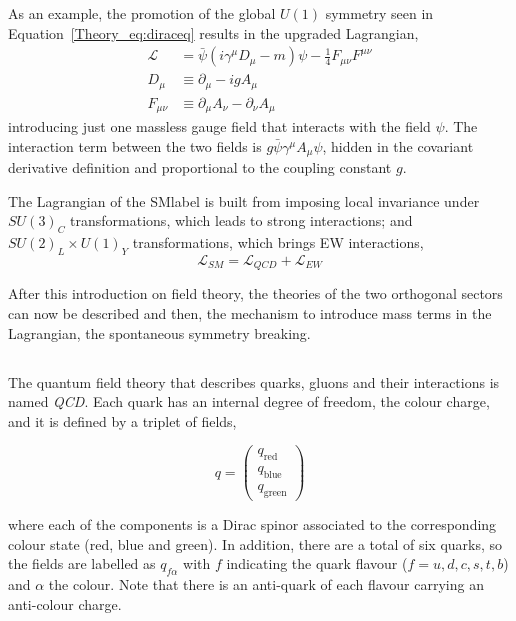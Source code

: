 As an example, the promotion of the global $U(1)$ symmetry seen in Equation~\ref{Theory_eq:diraceq} results in the upgraded Lagrangian,
\begin{equation}
\label{Theory_eq:diraceq20}
\begin{split}
    \mathcal{L}_{\ \ } &= \bar{\psi}(i\gamma^\mu D_\mu-m)\psi - \frac{1}{4}F_{\mu\nu}F^{\mu\nu} \\
    D_{\mu \ } &\equiv \partial_\mu -igA_\mu \\
    F_{\mu\nu} &\equiv \partial_\mu A_\nu - \partial_\nu A_\mu
\end{split}
\end{equation}
introducing just one massless gauge field that interacts with the field $\psi$.
The interaction term between the two fields is $g\bar{\psi}\gamma^\mu A_\mu\psi$,
hidden in the covariant derivative definition and proportional to the coupling constant $g$.

The Lagrangian of the \acrshort{SMlabel} is built from imposing local invariance under $SU(3)_C$ transformations,
which leads to strong interactions; and $SU(2)_L\times U(1)_Y$ transformations, which brings EW interactions,
\begin{equation}
    \mathcal{L}_{SM} = \mathcal{L}_{QCD}+\mathcal{L}_{EW}
\end{equation}

After this introduction on field theory, the theories of the two orthogonal sectors can now be described and then,
the mechanism to introduce mass terms in the Lagrangian, the spontaneous symmetry breaking.

\subsection{}
\label{subsec:QCD}
The quantum field theory that describes quarks, gluons and their interactions is named \textit{\acrlong{QCD}}. Each quark has an internal degree of freedom, the colour charge, and it is defined by a triplet of fields,

\begin{equation}
\label{Theory_eq:colortriplet}
    q=\begin{pmatrix}
    q_{\mathrm{red}}\\
    q_{\mathrm{blue}}\\
    q_{\mathrm{green}}
    \end{pmatrix}
\end{equation}

where each of the components is a Dirac spinor associated to the corresponding colour state (red, blue and green).
In addition, there are a total of six quarks, so the fields are labelled as $q_{f\alpha}$ with $f$ indicating the quark flavour
($f=u,d,c,s,t,b$) and $\alpha$ the colour. Note that there is an anti-quark of each flavour carrying an anti-colour charge.\\


